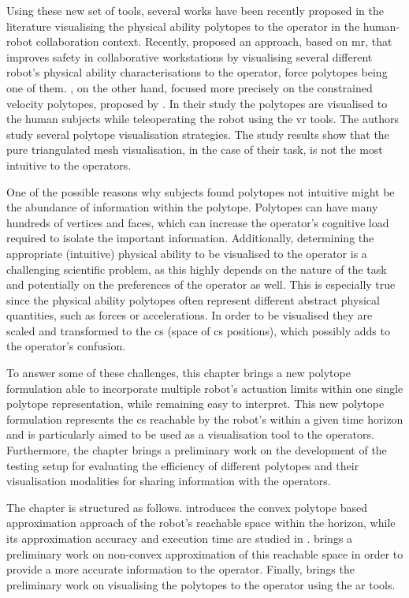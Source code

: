 Using these new set of tools, several works have been recently proposed in the literature visualising the physical ability polytopes to the operator in the human-robot collaboration context. Recently, \citet{Weistroffer2022Using} proposed an approach, based on \gls{mr}, that improves safety in collaborative workstations by visualising several different robot's physical ability characterisations to the operator, force polytopes being one of them. \citet{Zolotas2021}, on the other hand, focused more precisely on the constrained velocity polytopes, proposed by \citet{long_constrained_2020}. In their study the polytopes are visualised to the human subjects while teleoperating the robot using the \gls{vr} tools. The authors study several polytope visualisation strategies. The study results show that the pure triangulated mesh visualisation, in the case of their task, is not the most intuitive to the operators.

One of the possible reasons why subjects found polytopes not intuitive might be the abundance of information within the polytope. Polytopes can have many hundreds of vertices and faces, which can increase the operator's cognitive load required to isolate the important information. 
Additionally, determining the appropriate (intuitive) physical ability to be visualised to the operator is a challenging scientific problem, as this highly depends on the nature of the task and potentially on the preferences of the operator as well. This is especially true since the physical ability polytopes often represent different abstract physical quantities, such as forces or accelerations. In order to be visualised they are scaled and transformed to the \gls{cs} (space of \gls{cs} positions), which possibly adds to the operator's confusion. 

To answer some of these challenges, this chapter brings a new polytope formulation able to incorporate multiple robot's actuation limits within one single polytope representation, while remaining easy to interpret. This new polytope formulation represents the \gls{cs} reachable by the robot's within a given time horizon and is particularly aimed to be used as a visualisation tool to the operators. Furthermore, the chapter brings a preliminary work on the development of the testing setup for evaluating the efficiency of different polytopes and their visualisation modalities for sharing information with the operators. 

The chapter is structured as follows.  introduces the convex polytope based approximation approach of the robot's reachable space within the horizon, while its approximation accuracy and execution time are studied in .  brings a preliminary work on non-convex approximation of this reachable space in order to provide a more accurate information to the operator. Finally,  brings the preliminary work on visualising the polytopes to the operator using the \gls{ar} tools. 

